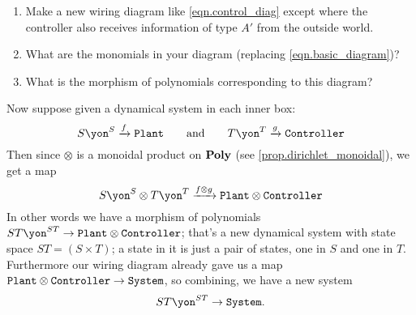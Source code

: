 \documentclass[Book-Poly]{subfiles}
\begin{document}
\begin{exercise}
\begin{enumerate}
	\item Make a new wiring diagram like \eqref{eqn.control_diag} except where the controller also receives information of type $A'$ from the outside world.
	\item What are the monomials in your diagram (replacing \eqref{eqn.basic_diagram})?
	\item What is the morphism of polynomials corresponding to this diagram?
\qedhere
\end{enumerate}
\end{exercise}

Now suppose given a dynamical system in each inner box:
\[
S\yon^S\To{f}\const{Plant}
\qqand
T\yon^T\To{g}\const{Controller}
\]
Then since $\otimes$ is a monoidal product on $\mathbf{Poly}$ (see \cref{prop.dirichlet_monoidal}), we get a map
\[
S\yon^S\otimes T\yon^T\To{f\otimes g}\const{Plant}\otimes\const{Controller}
\]
In other words we have a morphism of polynomials $ST\yon^{ST}\to \const{Plant}\otimes\const{Controller}$; that's a new dynamical system with state space $ST=(S\times T)$; a state in it is just a pair of states, one in $S$ and one in $T$. Furthermore our wiring diagram already gave us a map $\texttt{Plant}\otimes\texttt{Controller}\to\texttt{System}$, so combining, we have a new system
\[
ST\yon^{ST}\to\const{System}.
\]
\end{document}
